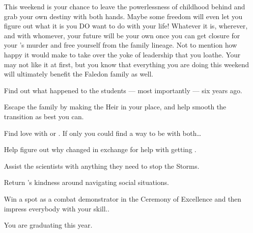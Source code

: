 \documentclass[char]{GL2020}
\begin{document}
This weekend is your chance to leave the powerlessness of childhood behind and grab your own destiny with both hands. Maybe some freedom will even let you figure out what it is you DO want to do with your life! Whatever it is, wherever, and with whomever, your future will be your own once you can get closure for your \cHeirSibling{\sibling}'s murder and free yourself from the family lineage. Not to mention how happy it would make \cAmbition{} to take over the yoke of leadership that you loathe. Your \cFaledonParent{\parent} may not like it at first, but you know that everything you are doing this weekend will ultimately benefit the Faledon family as well.  

\begin{itemz}
    \item Find out what happened to the students — most importantly \cHeirSibling{} — six years ago.
    \item Escape the \cHeir{\formal} family by making \cAmbition{} the Heir in your place, and help smooth the transition as best you can.  
    \item Find love with \cChupStudent{} or \cPresident{}. If only you could find a way to be with both\ldots{}
    \item Help \cWarlordDaughter{} figure out why \cLoud{} changed in exchange for \cWarlordDaughter{\their} help with getting \iMirror{}.
    \item Assist the scientists with anything they need to stop the Storms.
     \item Return \cAssistantScientist{}’s kindness around navigating social situations.
    \item Win a spot as a combat demonstrator in the Ceremony of Excellence and then impress everybody with your skill..
\end{itemz}

\begin{itemz}[Notes]
    \item You are graduating this year.
\end{itemz}
\end{document}

